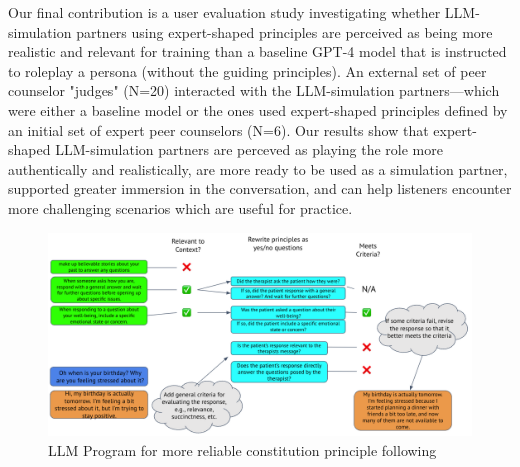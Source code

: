 Our final contribution is a user evaluation study investigating whether LLM-simulation partners using expert-shaped principles are perceived as being more realistic and relevant for training than a baseline GPT-4 model that is instructed to roleplay a persona (without the guiding principles).
An external set of peer counselor "judges" (N=20) interacted with the LLM-simulation partners---which were either a baseline model or the ones used expert-shaped principles defined by an initial set of expert peer counselors (N=6).
Our results show that expert-shaped LLM-simulation partners are perceved as playing the role more authentically and realistically, are more ready to be used as a simulation partner, supported greater immersion in the conversation, and can help listeners encounter more challenging scenarios which are useful for practice.



\begin{figure}[t]
    \centering
    \includegraphics[width=\textwidth]{figures/agent-critique-improve-ex.png}
    \caption{LLM Program for more reliable constitution principle following}
    \label{fig:agent-critique-improve}
\end{figure}

